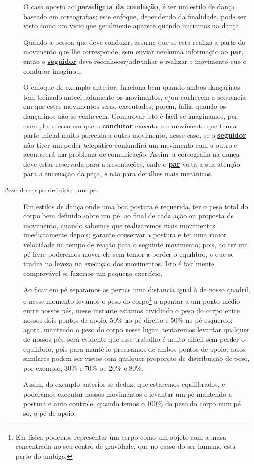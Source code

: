 \begin{description}
O caso oposto ao \hyperref[def:ParadigmaConducao]{\textbf{paradigma da condução}}, é ter um estilo de dança baseado em coreografias;
este enfoque, dependendo da finalidade, pode ser visto como um vicio que geralmente aparece quando iniciamos
na dança. 
\begin{example}
Quando a pessoa que deve conduzir, assume que se esta realiza a parte do movimento 
que lhe corresponde, sem enviar nenhuma informação ao \hyperref[def:Par]{\textbf{par}}, 
então o \hyperref[def:Seguidor]{\textbf{seguidor}} deve reconhecer/adivinhar e realizar o movimento que o condutor imaginou.
\end{example} 
O enfoque do exemplo anterior, funciona bem quando ambos dançarinos tem treinado antecipadamente os movimentos, 
e/ou conhecem a sequencia em que estes movimentos serão executados; 
porem, falha quando os dançarinos não se conhecem.
Comprovar isto é fácil se imaginamos, por exemplo, o caso em que o \hyperref[def:Condutor]{\textbf{condutor}} executa um movimento
que tem a parte inicial muito parecida a outro movimento, nesse caso, se o \hyperref[def:Seguidor]{\textbf{seguidor}} não tiver
um poder telepático confundirá um movimento com o outro e acontecerá um problema de comunicação. Assim, a coreografia
na dança deve estar reservada para apresentações, onde o \hyperref[def:Par]{\textbf{par}} volta 
a sua atenção para a encenação da peça, e não para detalhes mais mecânicos.

\item[Peso do corpo definido num pé:] Em estilos de dança onde uma boa postura é requerida,
ter o peso total do corpo bem definido sobre um pé, 
ao final de cada ação ou proposta de movimento,
quando sabemos que realizaremos mais movimentos imediatamente depois;
garante conservar a postura e ter uma maior velocidade no tempo de reação para o seguinte movimento;
pois, ao ter um pé livre poderemos mover ele sem temor a perder o equilibro, 
o que se traduz na leveza na execução dos movimentos. 
Isto é facilmente comprovável se fazemos um pequeno exercício. 
\begin{example}
Ao ficar em pé separamos as
pernas uma distancia igual à de nosso quadril, e nesse momento levamos o peso do corpo\footnote{
Em física podemos representar um corpo como um objeto com a masa concentrada no seu centro de gravidade, 
que no casso do ser humano está perto do umbigo.} a
apontar a um ponto médio entre nossos pés, nesse instante estamos dividindo o peso do corpo
entre nossos dois pontos de apoio, 50$\%$ no pé direito e 50$\%$ no pé esquerdo; agora, mantendo o peso
do corpo nesse lugar, tentaremos levantar qualquer de nossos pés, será evidente
que esse trabalho é muito difícil sem perder o equilíbrio, pois para mantê-lo
precisamos de ambos pontos de apoio; casos similares podem ser vistos com qualquer proporção de distribuição de peso,
por exemplo, 30$\%$ e 70$\%$ ou 20$\%$ e 80$\%$. 
\end{example}
Assim, do exemplo anterior se deduz, que estaremos
equilibrados, e poderemos executar nossos movimentos e levantar um pé 
mantendo a postura e auto controle, quando
temos o 100$\%$ do peso do corpo num pé só, o pé de apoio.
 

\end{description}
